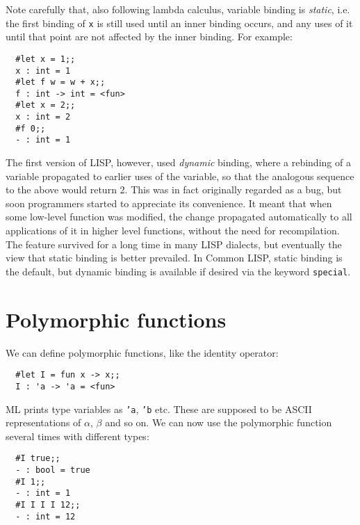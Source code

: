 Note carefully that, also following lambda calculus, variable binding is {\em
static}, i.e. the first binding of {\tt x} is still used until an inner binding
occurs, and any uses of it until that point are not affected by the inner
binding. For example:

\begin{boxed}\begin{verbatim}
  #let x = 1;;
  x : int = 1
  #let f w = w + x;;
  f : int -> int = <fun>
  #let x = 2;;
  x : int = 2
  #f 0;;
  - : int = 1
\end{verbatim}\end{boxed}

The first version of LISP, however, used {\em dynamic} binding, where a
rebinding of a variable propagated to earlier uses of the variable, so that the
analogous sequence to the above would return 2. This was in fact originally
regarded as a bug, but soon programmers started to appreciate its convenience.
It meant that when some low-level function was modified, the change propagated
automatically to all applications of it in higher level functions, without the
need for recompilation. The feature survived for a long time in many LISP
dialects, but eventually the view that static binding is better prevailed. In
Common LISP, static binding is the default, but dynamic binding is available if
desired via the keyword {\tt special}.

\section{Polymorphic functions}

We can define polymorphic functions, like the identity operator:

\begin{boxed}\begin{verbatim}
  #let I = fun x -> x;;
  I : 'a -> 'a = <fun>
\end{verbatim}\end{boxed}

ML prints type variables as {\tt 'a}, {\tt 'b} etc. These are supposed to be
ASCII representations of $\alpha$, $\beta$ and so on. We can now use the
polymorphic function several times with different types:

\begin{boxed}\begin{verbatim}
  #I true;;
  - : bool = true
  #I 1;;
  - : int = 1
  #I I I I 12;;
  - : int = 12
\end{verbatim}\end{boxed}


